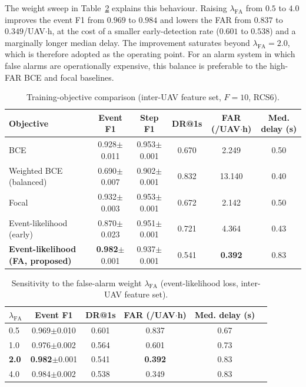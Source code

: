 The weight sweep in Table~\ref{tab:fa_sweep} explains this behaviour.
Raising $\lambda_{\mathrm{FA}}$ from $0.5$ to $4.0$ improves the event F1
from $0.969$ to $0.984$ and lowers the FAR from $0.837$ to
$0.349$/UAV$\cdot$h, at the cost of a smaller early-detection rate ($0.601$
to $0.538$) and a marginally longer median delay. The improvement saturates
beyond $\lambda_{\mathrm{FA}}{=}2.0$, which is therefore adopted as the
operating point. For an alarm system in which false alarms are operationally
expensive, this balance is preferable to the high-FAR BCE and focal
baselines.

\begin{table}[htbp]
  \centering
  \caption{Training-objective comparison (inter-UAV feature set,
    $F{=}10$, RCS6).}
  \label{tab:loss_objective}
  \begin{tabular}{lcccc c}
    \toprule
    Objective & Event F1 & Step F1 & DR@1s & FAR (/UAV$\cdot$h) & Med. delay (s) \\
    \midrule
    BCE                      & 0.928$\pm$0.011 & 0.953$\pm$0.001 & 0.670 & 2.249 & 0.50 \\
    Weighted BCE (balanced)  & 0.690$\pm$0.007 & 0.902$\pm$0.001 & 0.832 & 13.140 & 0.40 \\
    Focal                    & 0.932$\pm$0.003 & 0.953$\pm$0.001 & 0.672 & 2.142 & 0.50 \\
    Event-likelihood (early) & 0.870$\pm$0.023 & 0.951$\pm$0.001 & 0.721 & 4.364 & 0.43 \\
    \textbf{Event-likelihood (FA, proposed)} &
      \textbf{0.982}$\pm$0.001 & 0.937$\pm$0.001 & 0.541 & \textbf{0.392} & 0.83 \\
    \bottomrule
  \end{tabular}
\end{table}

\begin{table}[htbp]
  \centering
  \caption{Sensitivity to the false-alarm weight $\lambda_{\mathrm{FA}}$
    (event-likelihood loss, inter-UAV feature set).}
  \label{tab:fa_sweep}
  \begin{tabular}{lcccc c}
    \toprule
    $\lambda_{\mathrm{FA}}$ & Event F1 & DR@1s & FAR (/UAV$\cdot$h) & Med. delay (s) \\
    \midrule
    0.5 & 0.969$\pm$0.010 & 0.601 & 0.837 & 0.67 \\
    1.0 & 0.976$\pm$0.002 & 0.564 & 0.601 & 0.73 \\
    \textbf{2.0} & \textbf{0.982}$\pm$0.001 & 0.541 & \textbf{0.392} & 0.83 \\
    4.0 & 0.984$\pm$0.002 & 0.538 & 0.349 & 0.83 \\
    \bottomrule
  \end{tabular}
\end{table}

